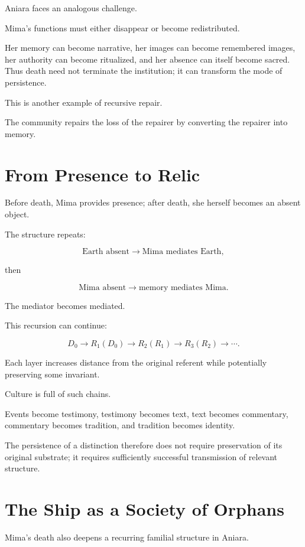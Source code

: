 \documentclass[11pt,oneside]{book}
\theoremstyle{definition}
\theoremstyle{remark}
\begin{document}
Aniara faces an analogous challenge.

Mima's functions must either disappear or become redistributed.

Her memory can become narrative, her images can become remembered images, her authority can become ritualized, and her absence can itself become sacred. Thus death need not terminate the institution; it can transform the mode of persistence.

This is another example of recursive repair.

The community repairs the loss of the repairer by converting the repairer into memory.

\section{From Presence to Relic}

Before death, Mima provides presence; after death, she herself becomes an absent object.

The structure repeats:

\[
\text{Earth absent}
\rightarrow
\text{Mima mediates Earth},
\]

then

\[
\text{Mima absent}
\rightarrow
\text{memory mediates Mima}.
\]

The mediator becomes mediated.

This recursion can continue:

\[
D_0
\rightarrow
R_1(D_0)
\rightarrow
R_2(R_1)
\rightarrow
R_3(R_2)
\rightarrow\cdots.
\]

Each layer increases distance from the original referent while potentially preserving some invariant.

Culture is full of such chains.

Events become testimony, testimony becomes text, text becomes commentary, commentary becomes tradition, and tradition becomes identity.

The persistence of a distinction therefore does not require preservation of its original substrate; it requires sufficiently successful transmission of relevant structure.

\section{The Ship as a Society of Orphans}

Mima's death also deepens a recurring familial structure in Aniara.
\end{document}
